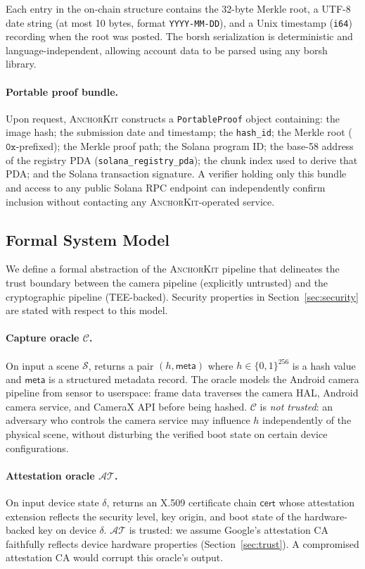 \documentclass[11pt,a4paper]{article}
\newcommand{\calC}{\mathcal{C}}
\newcommand{\calAT}{\mathcal{AT}}
\newcommand{\sfmeta}{\mathsf{meta}}
\newcommand{\sfcert}{\mathsf{cert}}
\newcommand{\AK}{\textsc{AnchorKit}\xspace}
\begin{document}
Each entry in the on-chain structure contains the 32-byte Merkle root, a UTF-8
date string (at most 10 bytes, format \texttt{YYYY-MM-DD}), and a Unix
timestamp (\texttt{i64}) recording when the root was posted.  The borsh
serialization is deterministic and language-independent, allowing account data
to be parsed using any borsh library.

\paragraph{Portable proof bundle.}
Upon request, \AK constructs a \texttt{PortableProof} object containing: the
image hash; the submission date and timestamp; the \texttt{hash\_id}; the
Merkle root ($\texttt{0x}$-prefixed); the Merkle proof path; the Solana program
ID; the base-58 address of the registry PDA
(\texttt{solana\_registry\_pda}); the chunk index used to derive that PDA; and
the Solana transaction signature.  A verifier holding only this bundle and
access to any public Solana RPC endpoint can independently confirm inclusion
without contacting any \AK-operated service.

\subsection{Formal System Model}
\label{sec:sysmodel}

We define a formal abstraction of the \AK pipeline that delineates the trust
boundary between the camera pipeline (explicitly untrusted) and the
cryptographic pipeline (TEE-backed).  Security properties in
Section~\ref{sec:security} are stated with respect to this model.

\paragraph{Capture oracle $\calC$.} On input a scene $\mathcal{S}$, returns a
pair $(h, \sfmeta)$ where $h \in \{0,1\}^{256}$ is a hash value and $\sfmeta$
is a structured metadata record.  The oracle models the Android camera pipeline
from sensor to userspace: frame data traverses the camera HAL, Android camera
service, and CameraX API before being hashed.  $\calC$ is \emph{not trusted}:
an adversary who controls the camera service may influence $h$ independently of
the physical scene, without disturbing the verified boot state on certain device
configurations.

\paragraph{Attestation oracle $\calAT$.} On input device state $\delta$,
returns an X.509 certificate chain $\sfcert$ whose attestation extension
reflects the security level, key origin, and boot state of the hardware-backed
key on device $\delta$.  $\calAT$ is trusted: we assume Google's attestation CA
faithfully reflects device hardware properties
(Section~\ref{sec:trust}).  A compromised attestation CA would corrupt this
oracle's output.
\end{document}
